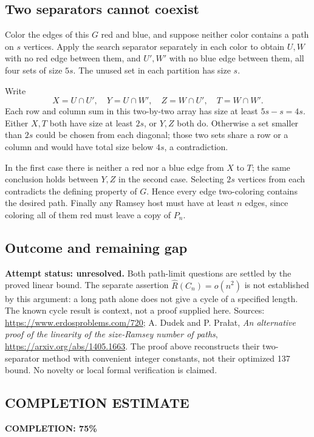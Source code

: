 \subsection*{Two separators cannot coexist}
Color the edges of this $G$ red and blue, and suppose neither color contains a path on $s$ vertices. Apply the search separator separately in each color to obtain $U,W$ with no red edge between them, and $U',W'$ with no blue edge between them, all four sets of size $5s$. The unused set in each partition has size $s$.

Write
\[
 X=U\cap U',\quad Y=U\cap W',\quad
 Z=W\cap U',\quad T=W\cap W'.
\]
Each row and column sum in this two-by-two array has size at least $5s-s=4s$.
Either $X,T$ both have size at least $2s$, or $Y,Z$ both do. Otherwise a set smaller than $2s$ could be chosen from each diagonal; those two sets share a row or a column and would have total size below $4s$, a contradiction.

In the first case there is neither a red nor a blue edge from $X$ to $T$; the same conclusion holds between $Y,Z$ in the second case. Selecting $2s$ vertices from each contradicts the defining property of $G$. Hence every edge two-coloring contains the desired path.
Finally any Ramsey host must have at least $n$ edges, since coloring all of them red must leave a copy of $P_n$.

\subsection*{Outcome and remaining gap}
\textbf{Attempt status: unresolved.} Both path-limit questions are settled by the proved linear bound. The separate assertion $\widehat R(C_n)=o(n^2)$ is not established by this argument: a long path alone does not give a cycle of a specified length. The known cycle result is context, not a proof supplied here.
Sources: \url{https://www.erdosproblems.com/720}; A. Dudek and P. Pra\l at, \emph{An alternative proof of the linearity of the size-Ramsey number of paths}, \url{https://arxiv.org/abs/1405.1663}. The proof above reconstructs their two-separator method with convenient integer constants, not their optimized 137 bound. No novelty or local formal verification is claimed.

\subsection*{COMPLETION ESTIMATE}
\textbf{COMPLETION: 75\%}
